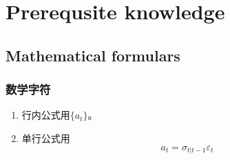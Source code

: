 \section{Prerequsite knowledge}
	\subsection{Mathematical formulars}
		\subsubsection{数学字符}
			\begin{enumerate}
				\setlength{\itemsep}{0pt}
				\setlength{\parsep}{0pt}
				\setlength{\parskip}{0pt}
		
				\item 行内公式用$\{a_{t}\}$。
				\item 单行公式用
					\begin{displaymath}
							a_{t}=\sigma_{t | t-1} \varepsilon_{t}
					\end{displaymath}
			\end{enumerate}

